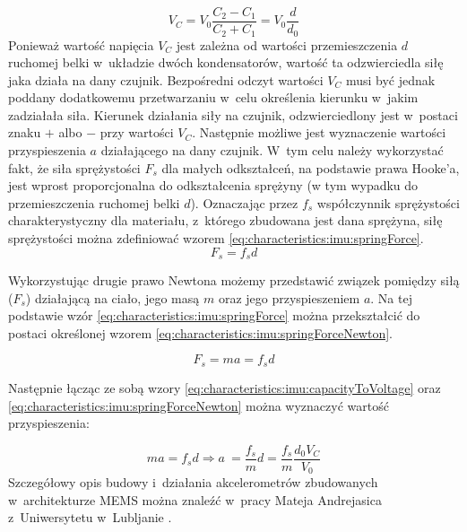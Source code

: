 \begin{equation}
	V_C = V_0 \frac{C_2-C_1}{C_2+C_1} = V_0\frac{d}{d_0}
	\label{eq:characteristics:imu:capacityToVoltage}
\end{equation}																																												
Ponieważ wartość napięcia $V_C$ jest zależna od wartości przemieszczenia $d$ ruchomej belki w~układzie dwóch kondensatorów, wartość ta odzwierciedla siłę jaka działa na dany czujnik. Bezpośredni odczyt wartości $V_C$ musi być jednak poddany dodatkowemu przetwarzaniu w~celu określenia kierunku w~jakim zadziałała siła. Kierunek działania siły na czujnik, odzwierciedlony jest w~postaci znaku $+$ albo $-$ przy wartości $V_C$. Następnie możliwe jest wyznaczenie wartości przyspieszenia $a$ działającego na dany czujnik. W~tym celu należy wykorzystać fakt, że siła sprężystości $F_s$ dla małych odkształceń, na podstawie prawa Hooke'a, jest wprost proporcjonalna do odkształcenia sprężyny (w tym wypadku do przemieszczenia ruchomej belki $d$). Oznaczając przez $f_s$ współczynnik sprężystości charakterystyczny dla materiału, z~którego zbudowana jest dana sprężyna, siłę sprężystości można zdefiniować wzorem \ref{eq:characteristics:imu:springForce}.																																											
\begin{equation}
	F_s = f_s d
	\label{eq:characteristics:imu:springForce}
\end{equation}	
																																	
Wykorzystując drugie prawo Newtona możemy przedstawić związek pomiędzy siłą ($F_s$) działającą na ciało, jego masą $m$ oraz jego przyspieszeniem $a$. Na tej podstawie wzór \ref{eq:characteristics:imu:springForce} można przekształcić do postaci określonej wzorem \ref{eq:characteristics:imu:springForceNewton}.
	
\begin{equation}
	F_s = ma = f_s d
	\label{eq:characteristics:imu:springForceNewton}
\end{equation}	
			
Następnie łącząc ze sobą wzory \ref{eq:characteristics:imu:capacityToVoltage} oraz \ref{eq:characteristics:imu:springForceNewton} można wyznaczyć wartość przyspieszenia:
					
\begin{equation}
	ma = f_s d \Rightarrow a~= \frac{f_s}{m} d = \frac{f_s}{m} \frac{d_0 V_C}{V_0}
	\label{eq:characteristics:imu:acceleration}
\end{equation}																																											
Szczegółowy opis budowy i~działania akcelerometrów zbudowanych w~architekturze MEMS można znaleźć w~pracy Mateja Andrejasica z~Uniwersytetu w~Lubljanie \cite{Andrejasic2008}.																																											
